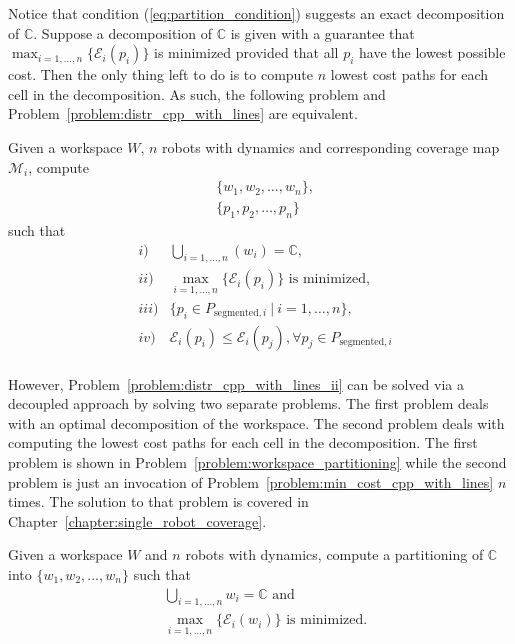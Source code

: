 \documentclass[../main.tex]{subfiles}
\begin{document}
Notice that condition (\ref{eq:partition_condition}) suggests an exact decomposition of $\mathbb{C}$. Suppose a decomposition of $\mathbb{C}$ is given with a guarantee that $\max_{i=1,\ldots,n}\{\mathcal{E}_i(p_i)\}$ is minimized provided that all $p_i$ have the lowest possible cost. Then the only thing left to do is to compute $n$ lowest cost paths for each cell in the decomposition. As such, the following problem and Problem~\ref{problem:distr_cpp_with_lines} are equivalent.
\begin{problem}[]
\label{problem:distr_cpp_with_lines_ii}
	Given a workspace $W$, $n$ robots with dynamics and corresponding coverage map $\mathcal{M}_i$, compute
	\begin{equation}
	\begin{aligned}
		&\{w_1,w_2,\ldots,w_n\},\\
		&\{p_1,p_2,\ldots,p_n\}
	\end{aligned}
	\end{equation}
	such that
	\begin{equation}
	\begin{aligned}
		&i)& \bigcup_{i=1,\dots,n}(w_i)=\mathbb{C},\\
		&ii)& \max_{i=1,\ldots,n}\{\mathcal{E}_i(p_i)\}\text{ is minimized,}\\
		&iii) &\{p_i\in P_{\text{segmented},i}\ |\ i=1,\dots,n\},\\
		&iv)&\mathcal{E}_i(p_i)\leq\mathcal{E}_i(p_j), \forall p_j\in P_{\text{segmented},i}\\
	\end{aligned}
	\end{equation}
\end{problem}

However, Problem~\ref{problem:distr_cpp_with_lines_ii} can be solved via a decoupled approach by solving two separate problems. The first problem deals with an optimal decomposition of the workspace. The second problem deals with computing the lowest cost paths for each cell in the decomposition. The first problem is shown in Problem~\ref{problem:workspace_partitioning} while the second problem is just an invocation of Problem~\ref{problem:min_cost_cpp_with_lines} $n$ times. The solution to that problem is covered in Chapter~\ref{chapter:single_robot_coverage}.

\begin{problem}
\label{problem:workspace_partitioning}
	Given a workspace $W$ and $n$ robots with dynamics, compute a partitioning of $\mathbb{C}$ into $\{w_1,w_2,\dots,w_n\}$ such that
	\begin{equation}
	\begin{aligned}
		& \bigcup_{i=1,\dots,n}w_i=\mathbb{C}\text{ and}\\
		& \max_{i=1,\ldots,n}\{\mathcal{E}_i(w_i)\}\text{ is minimized.}
	\end{aligned}
	\end{equation}
\end{problem}
\end{document}
